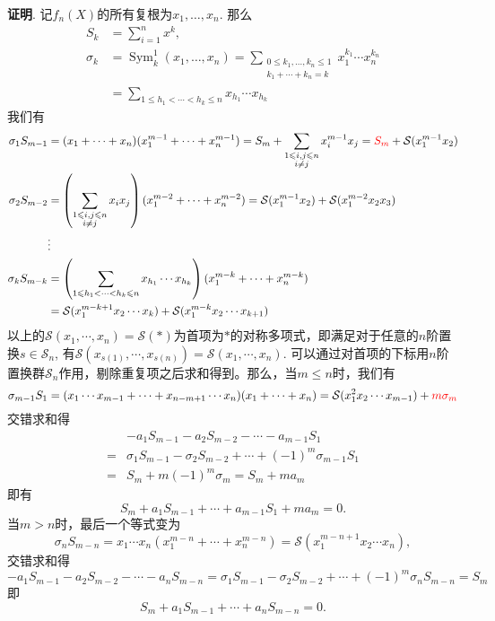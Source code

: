 {\bf 证明}. 记$f_n(X)$的所有复根为$x_1,\ldots,x_n$. 那么
\begin{align*}
S_k & = \sum\limits_{i=1}^n x^k, \\
\sigma_k & = \operatorname{Sym}_k^1(x_1,\ldots,x_n) = \sum\limits_{\substack{0 \leqslant k_1,\ldots,k_n \leqslant 1 \\ k_1+\cdots+k_n=k}} x_1^{k_1} \cdots x_n^{k_n} \\
& = \sum\limits_{1 \leqslant h_1 < \cdots < h_k \leqslant n} x_{h_1} \cdots x_{h_k}
\end{align*}
我们有
\begin{align*}
\sigma_1 S_{m-1} & = (x_1 + \cdots + x_n) (x_1^{m-1} + \cdots + x_n^{m-1}) = S_m + \sum_{\substack{1 \leqslant i,j \leqslant n \\ i\neq j}} x_i^{m-1} x_j = {\color{red} S_m} + \mathcal{S}(x_1^{m-1}x_2) \\
\sigma_2 S_{m-2} & = \left( \sum_{\substack{1 \leqslant i,j \leqslant n \\ i\neq j}} x_i x_j \right) (x_1^{m-2} + \cdots + x_n^{m-2}) = \mathcal{S}(x_1^{m-1}x_2) + \mathcal{S}(x_1^{m-2}x_2x_3) \\
& \vdots \\
\sigma_k S_{m-k} & = \left( \sum\limits_{1 \leqslant h_1 < \cdots < h_k \leqslant n} x_{h_1} \cdots x_{h_k} \right) (x_1^{m-k} + \cdots + x_n^{m-k}) \\
& = \mathcal{S}(x_1^{m-k+1}x_2\cdots x_k) + \mathcal{S}(x_1^{m-k}x_2\cdots x_{k+1})
\end{align*}
以上的$\mathcal{S}(x_1,\cdots,x_n) = \mathcal{S}(\ast)$为首项为$\ast$的对称多项式，即满足对于任意的$n$阶置换$s\in \mathcal{S}_n$, 有$\mathcal{S}(x_{s(1)},\cdots,x_{s(n)}) = \mathcal{S}(x_1,\cdots,x_n)$. 可以通过对首项的下标用$n$阶置换群$\mathcal{S}_n$作用，剔除重复项之后求和得到。那么，当$m\leqslant n$时，我们有
$$\sigma_{m-1} S_1 = (x_1\cdots x_{m-1} + \cdots + x_{n-m+1}\cdots x_{n}) (x_1 + \cdots + x_{n}) = \mathcal{S}(x_1^2x_2\cdots x_{m-1}) + {\color{red} m\sigma_m}$$
交错求和得
\begin{align*}
& -a_1 S_{m-1} - a_2 S_{m-2} - \cdots - a_{m-1} S_1 \\
= & \sigma_1 S_{m-1} - \sigma_2 S_{m-2} + \cdots + (-1)^{m} \sigma_{m-1} S_{1} \\
= & S_m + m(-1)^{m}\sigma_m = S_m + ma_m
\end{align*}
即有
$$S_m + a_1S_{m-1} + \cdots + a_{m-1}S_1 + ma_m = 0.$$
当$m > n$时，最后一个等式变为
$$\sigma_n S_{m-n} = x_1\cdots x_n (x_1^{m-n} + \cdots + x_n^{m-n}) = \mathcal{S}(x_1^{m-n+1}x_2 \cdots x_n),$$
交错求和得
$$-a_1 S_{m-1} - a_2 S_{m-2} - \cdots - a_n S_{m-n} = \sigma_1 S_{m-1} - \sigma_2 S_{m-2} + \cdots + (-1)^{m} \sigma_n S_{m-n} = S_m$$
即
$$S_m + a_1 S_{m-1} + \cdots + a_n S_{m-n} = 0.$$

